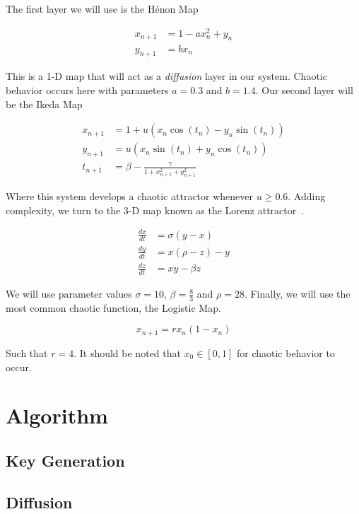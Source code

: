 \documentclass[conference]{IEEEtran}
\begin{document}
The first layer we will use is the Hénon Map\cite{Hamdy}

\begin{align}\label{eq:Henon}
    x_{n+1} &= 1 - ax_n^2 + y_n \\
    y_{n+1} &= bx_n
\end{align}

This is a 1-D map that will act as a \textit{diffusion} layer in our system.
Chaotic behavior occurs here with parameters $a=0.3$ and $b=1.4$.
Our second layer will be the Ikeda Map~\cite{app112110190}

\begin{align}\label{eq:Ikeda}
    x_{n+1} &= 1 + u(x_n \cos(t_n) - y_n \sin(t_n))\\
    y_{n+1} &= u(x_n \sin(t_n) + y_n \cos(t_n))\\
    t_{n+1} &= \beta - \frac{\gamma}{1+x_{n+1}^2+y_{n+1}^2}
\end{align}

Where this system develops a chaotic attractor whenever $u\ge0.6$.
Adding complexity, we turn to the 3-D map known as the Lorenz attractor~\cite{Naik2022}.

\begin{align}\label{eq:Lorenz}
    \frac{dx}{dt} &= \sigma (y - x)\\
    \frac{dy}{dt} &= x (\rho - z) - y\\
    \frac{dz}{dt} &= xy - \beta z
\end{align}

We will use parameter values $\sigma=10$, $\beta=\frac{8}{3}$ and $\rho=28$.
Finally, we will use the most common chaotic function, the Logistic Map.

\begin{equation}\label{eq:Logistic}
    x_{n+1} = r x_n (1 - x_n)
\end{equation}

Such that $r=4$.
It should be noted that $x_0 \in [0,1]$ for chaotic behavior to occur.

\section{Algorithm}\label{sec:algorithm}

\subsection{Key Generation}\label{subsec:key-generation}

\subsection{Diffusion}\label{subsec:diffusion}
\end{document}

